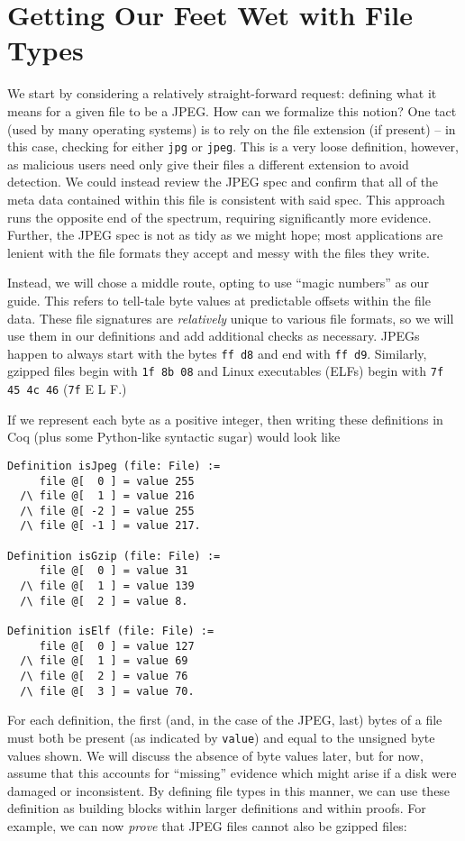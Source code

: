 \documentclass[nocopyrightspace]{sigplanconf}
\begin{document}
\section{Getting Our Feet Wet with File Types}

We start by considering a relatively straight-forward request: defining what
it means for a given file to be a JPEG. How can we formalize this notion? One
tact (used by many operating systems) is to rely on the file extension (if
present) -- in this case, checking for either {\tt jpg} or {\tt jpeg}. This is
a very loose definition, however, as malicious users need only give their
files a different extension to avoid detection. We could instead review the
JPEG spec and confirm that all of the meta data contained within this file is
consistent with said spec. This approach runs the opposite end of the
spectrum, requiring significantly more evidence. Further, the JPEG spec is not
as tidy as we might hope; most applications are lenient with the file formats
they accept and messy with the files they write.

Instead, we will chose a middle route, opting to use ``magic numbers'' as our
guide. This refers to tell-tale byte values at predictable offsets within the
file data. These file signatures are {\it relatively} unique to various file
formats, so we will use them in our definitions and add additional checks as
necessary. JPEGs happen to always start with the bytes {\tt ff d8} and end
with {\tt ff d9}. Similarly, gzipped files begin with {\tt 1f 8b 08} and Linux
executables (ELFs) begin with {\tt 7f 45 4c 46} ({\tt 7f} E L F.)

If we represent each byte as a positive integer, then writing these
definitions in Coq (plus some Python-like syntactic sugar) would look like

\begin{lstlisting}
Definition isJpeg (file: File) :=
     file @[  0 ] = value 255
  /\ file @[  1 ] = value 216 
  /\ file @[ -2 ] = value 255
  /\ file @[ -1 ] = value 217.

Definition isGzip (file: File) :=
     file @[  0 ] = value 31
  /\ file @[  1 ] = value 139 
  /\ file @[  2 ] = value 8.

Definition isElf (file: File) :=
     file @[  0 ] = value 127
  /\ file @[  1 ] = value 69 
  /\ file @[  2 ] = value 76
  /\ file @[  3 ] = value 70.
\end{lstlisting}

For each definition, the first (and, in the case of the JPEG, last) bytes of a
file must both be present (as indicated by {\tt value}) and equal to the
unsigned byte values shown. We will discuss the absence of byte values later,
but for now, assume that this accounts for ``missing'' evidence which might
arise if a disk were damaged or inconsistent. By defining file types in this
manner, we can use these definition as building blocks within larger
definitions and within proofs. For example, we can now {\it prove} that JPEG
files cannot also be gzipped files:
\end{document}
